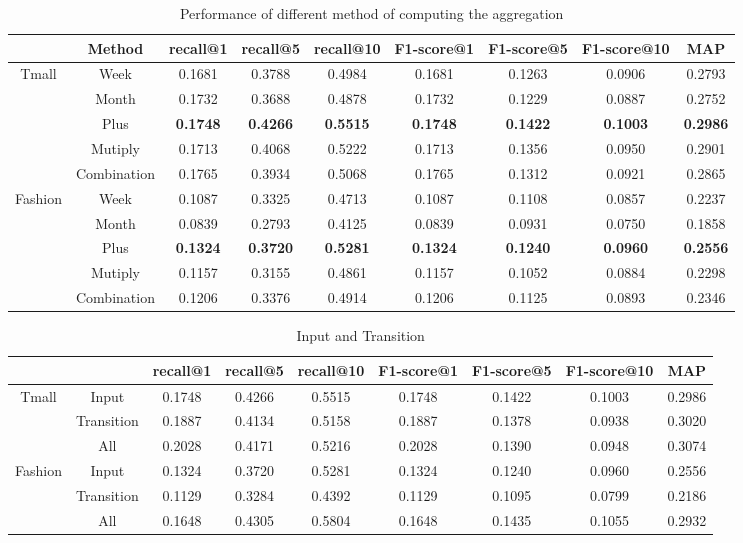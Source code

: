 \documentclass[conference]{IEEEtran}
\begin{document}
\begin{table}[!htbp]
\centering\scriptsize
\caption{Performance of different method of computing the aggregation}
    \begin{tabular}{ccccccccc}
    \toprule
          & Method& recall@1 & recall@5 & recall@10&F1-score@1 & F1-score@5 & F1-score@10&MAP\\
    \midrule
    \multirow{5}[0]{*}{Tmall} 
        &Week& 0.1681& 0.3788& 0.4984& 0.1681& 0.1263& 0.0906&0.2793\\
        &Month& 0.1732& 0.3688& 0.4878& 0.1732& 0.1229& 0.0887&0.2752\\
        &Plus& \textbf{0.1748}& \textbf{0.4266}& \textbf{0.5515}& \textbf{0.1748}& \textbf{0.1422}& \textbf{0.1003}& \textbf{0.2986}\\
        &Mutiply& 0.1713& 0.4068& 0.5222& 0.1713& 0.1356& 0.0950&0.2901\\
        &Combination& 0.1765& 0.3934& 0.5068& 0.1765& 0.1312& 0.0921&0.2865\\
    \midrule
    \multirow{5}[0]{*}{Fashion} 
        &Week& 0.1087& 0.3325& 0.4713& 0.1087& 0.1108& 0.0857&0.2237\\
        &Month& 0.0839& 0.2793& 0.4125& 0.0839& 0.0931& 0.0750&0.1858\\
        &Plus& \textbf{0.1324}& \textbf{0.3720}& \textbf{0.5281}& \textbf{0.1324}& \textbf{0.1240}& \textbf{0.0960}& \textbf{0.2556}\\
        &Mutiply& 0.1157& 0.3155& 0.4861& 0.1157& 0.1052& 0.0884&0.2298\\
        &Combination& 0.1206& 0.3376& 0.4914& 0.1206& 0.1125& 0.0893&0.2346\\
    \bottomrule
\end{tabular}%
\end{table}%

\begin{table}[htbp]
\centering\scriptsize
\caption{Input and Transition}
\begin{tabular}{ccccccccc}
    \toprule
          &  & recall@1 & recall@5 & recall@10 & F1-score@1 & F1-score@5 & F1-score@10 & MAP   \\
    \midrule
    \multirow{3}[0]{*}{Tmall} 
        &Input   &0.1748 &0.4266 & 0.5515  &0.1748  &0.1422  &0.1003  &0.2986   \\
        &Transition  &0.1887 & 0.4134  &0.5158&  0.1887& 0.1378  &0.0938&  0.3020   \\
        &All &0.2028  &0.4171  &0.5216  &0.2028  &0.1390  &0.0948 & 0.3074\\
    \midrule
    \multirow{3}[0]{*}{Fashion} 
        &Input   &0.1324  &0.3720  &0.5281  &0.1324  &0.1240 & 0.0960  &0.2556   \\
        &Transition  &0.1129  &0.3284  &0.4392  &0.1129  &0.1095  &0.0799  &0.2186   \\
        &All &0.1648  &0.4305  &0.5804  &0.1648 & 0.1435&  0.1055  &0.2932\\
    \bottomrule
\end{tabular}%
\label{tab:InputAndTransition}%
\end{table}%
\end{document}
